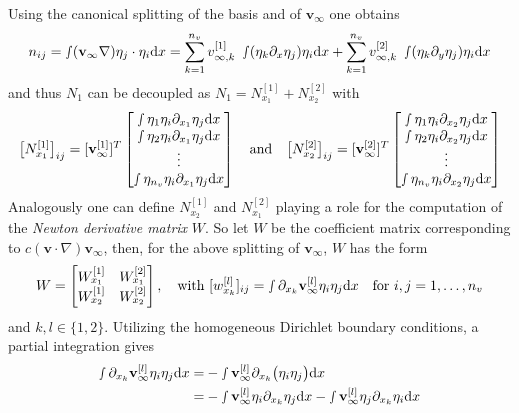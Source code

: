 \documentclass[a4paper,10pt,BCOR=15mm]{scrbook}
\providecommand{\inva}[1]{\text{d} #1}
\providecommand{\andi}[0]{\quad \text{and} \quad}
\begin{document}
Using the canonical splitting of the basis and of $\mathbf v_\infty$ one obtains
\begin{equation*}
 n_{ij} = \smallint (\mathbf v_\infty  \nabla) \eta_j \cdot \eta_i\inva x = \sum_{k=1}^{n_v} v_{\infty,k}^{[1]}\ \smallint (\eta_k \partial_x \eta_j ) \eta_i\inva x+\sum_{k=1}^{n_v} v_{\infty,k}^{[2]}\ \smallint (\eta_k \partial_y \eta_j )\eta_i\inva x
\end{equation*}
and thus $N_1$ can be decoupled as $N_1=N_{x_1}^{[1]}+N_{x_2}^{[2]}$ with
\begin{equation*}
 \bigl [ N_{x_1}^{[1]} \bigr ]_{ij}=[\mathbf v_\infty ^{[1]}]^T \begin{bmatrix} \smallint \eta_1 \eta_i \partial_{x_1} \eta_j \inva x\\ \smallint \eta_2 \eta_i \partial_{x_1} \eta_j\inva x \\ \vdots \\ \smallint \eta_{n_v} \eta_i \partial_{x_1} \eta_j \inva x\end{bmatrix} \andi
\bigl [ N_{x_2}^{[2]} \bigr ]_{ij}=[\mathbf v_\infty ^{[2]}]^T\begin{bmatrix} \smallint \eta_{1} \eta_i \partial_{x_2} \eta_j \inva x\\ \smallint \eta_{2} \eta_i \partial_{x_2} \eta_j \inva x\\ \vdots \\ \smallint \eta_{n_v} \eta_i \partial_{x_2} \eta_j\inva x \end{bmatrix}
\end{equation*}
Analogously one can define $N_{x_2}^{[1]}$ and $N_{x_1}^{[2]}$ playing a role for the computation of the \textit{Newton derivative matrix} $W$. So let $W$ be the coefficient matrix corresponding to $c(\mathbf v \cdot \nabla)\mathbf v_\infty$, then, for the above splitting of $\mathbf v_\infty$, $W$ has the form
\begin{equation*}
 W= \begin{bmatrix} W_{x_1}^{[1]}& W_{x_1}^{[2]} \\ W_{x_2}^{[1]} & W_{x_2}^{[2]} \end{bmatrix} , \quad  \text{with  } [w_{x_k}^{[l]}]_{ij}=\smallint \partial_{x_k} \mathbf v_{\infty}^{[l]}  \eta_i \eta_j \inva x\quad \text{for  } i,j=1,\dotsc,n_v
\end{equation*}
and $k,l \in \{1,2\}$. Utilizing the homogeneous Dirichlet boundary conditions, a partial integration gives
\begin{align*}
\smallint \partial_{x_k} \mathbf v_{\infty}^{[l]}  \eta_i \eta_j \inva x=& -\smallint  \mathbf v_{\infty}^{[l]} \partial_{x_k} \bigl( \eta_i \eta_j \bigr)\inva x \\
=&-\smallint  \mathbf v_{\infty}^{[l]}  \eta_i \partial_{x_k} \eta_j\inva x -\smallint  \mathbf v_{\infty}^{[l]}  \eta_j \partial_{x_k} \eta_i\inva x
\end{align*}
\end{document}
